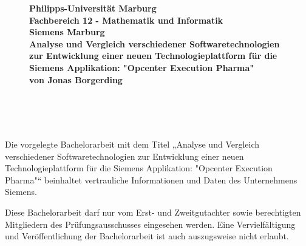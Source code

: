 \documentclass[ngerman]{article}
\begin{document}
    \sloppy
    \pagestyle{empty}
    \begin{figure}
        \begin{center}
            {\huge\textbf{Philipps-Universität Marburg}}\\
            \vspace{.2cm}
            {\small \textbf{Fachbereich 12 - Mathematik und Informatik}}\\\vspace{.5cm}
            \vspace{.2cm}
            {\huge\textbf{Siemens Marburg}}\\
            \vspace{1.5cm}
            {\LARGE\textbf{Analyse und Vergleich verschiedener Softwaretechnologien zur Entwicklung einer neuen Technologieplattform für die Siemens Applikation: "Opcenter Execution Pharma"}}\\
            \vspace{.5cm}
            \textbf{von Jonas Borgerding}
        \end{center}
    \end{figure}
    \clearpage
    \noindent
    \hspace*{\fill}\\\\\\
    \begin{center}
        Die vorgelegte Bachelorarbeit mit dem Titel „Analyse und Vergleich verschiedener Softwaretechnologien zur Entwicklung einer neuen Technologieplattform für die Siemens Applikation: "Opcenter Execution Pharma"“ beinhaltet vertrauliche Informationen und Daten des Unternehmens Siemens.
    \end{center}
    \vspace{4mm}
    \begin{center}
        Diese Bachelorarbeit darf nur vom Erst- und Zweitgutachter sowie berechtigten Mitgliedern des Prüfungsausschusses eingesehen werden. Eine Vervielfältigung und Veröffentlichung der Bachelorarbeit ist auch auszugsweise nicht erlaubt.
    \end{center}
    \vspace{4mm}
\end{document}
